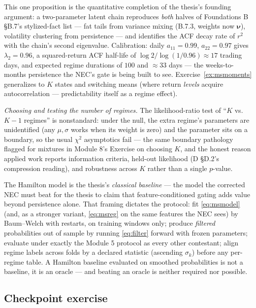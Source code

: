\documentclass[11pt]{article}
\numberwithin{equation}{section}
\theoremstyle{plain}
\theoremstyle{definition}
\theoremstyle{remark}
\newcounter{exercise}
\newcommand{\bnu}{\bm{\nu}}
\begin{document}
This one proposition is the quantitative completion of the thesis's founding argument: a two-parameter latent chain reproduces \emph{both} halves of Foundations B \S B.7's stylized-fact list --- fat tails from variance mixing (B.7.3, weights now $\bnu$), volatility clustering from persistence --- and identifies the ACF decay rate of $r^2$ with the chain's second eigenvalue. Calibration: daily $a_{11} = 0.99$, $a_{22} = 0.97$ gives $\lambda_2 = 0.96$, a squared-return ACF half-life of $\log 2 / \log(1/0.96) \approx 17$ trading days, and expected regime durations of $100$ and $\approx 33$ days --- the weeks-to-months persistence the NEC's gate is being built to see. Exercise~\ref{ex:msmoments} generalizes to $K$ states and switching means (where return \emph{levels} acquire autocorrelation --- predictability itself as a regime effect).

\emph{Choosing and testing the number of regimes.} The likelihood-ratio test of ``$K$ vs.\ $K-1$ regimes'' is nonstandard: under the null, the extra regime's parameters are unidentified (any $\mu, \sigma$ works when its weight is zero) and the parameter sits on a boundary, so the usual $\chi^2$ asymptotics fail --- the same boundary pathology flagged for mixtures in Module 8's Exercise on choosing $K$, and the honest reason applied work reports information criteria, held-out likelihood (D \S D.2's compression reading), and robustness across $K$ rather than a single $p$-value.

\begin{necbox}
The Hamilton model is the thesis's \emph{classical baseline} --- the model the corrected NEC must beat for the thesis to claim that feature-conditioned gating adds value beyond persistence alone. That framing dictates the protocol: fit \eqref{eq:msmodel} (and, as a stronger variant, \eqref{eq:msreg} on the same features the NEC sees) by Baum--Welch with restarts, on training windows only; produce \emph{filtered} probabilities out of sample by running \eqref{eq:filter} forward with frozen parameters; evaluate under exactly the Module 5 protocol as every other contestant; align regime labels across folds by a declared statistic (ascending $\sigma_k$) before any per-regime table. A Hamilton baseline evaluated on smoothed probabilities is not a baseline, it is an oracle --- and beating an oracle is neither required nor possible.
\end{necbox}


\subsection*{Checkpoint exercise}
\end{document}
